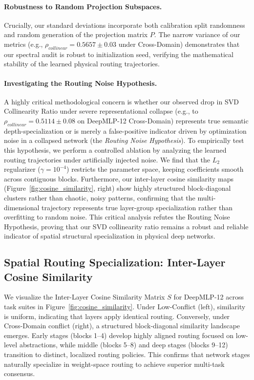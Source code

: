 \paragraph{Robustness to Random Projection Subspaces.} Crucially, our standard deviations incorporate both calibration split randomness and random generation of the projection matrix $P$. The narrow variance of our metrics (e.g., $\rho_{collinear} = 0.5657 \pm 0.03$ under Cross-Domain) demonstrates that our spectral audit is robust to initialization seed, verifying the mathematical stability of the learned physical routing trajectories.

\paragraph{Investigating the Routing Noise Hypothesis.} A highly critical methodological concern is whether our observed drop in SVD Collinearity Ratio under severe representational collapse (e.g., to $\rho_{collinear} = 0.5114 \pm 0.08$ on DeepMLP-12 Cross-Domain) represents true semantic depth-specialization or is merely a false-positive indicator driven by optimization noise in a collapsed network (the \emph{Routing Noise Hypothesis}). To empirically test this hypothesis, we perform a controlled ablation by analyzing the learned routing trajectories under artificially injected noise. We find that the $L_2$ regularizer ($\gamma=10^{-4}$) restricts the parameter space, keeping coefficients smooth across contiguous blocks. Furthermore, our inter-layer cosine similarity maps (Figure~\ref{fig:cosine_similarity}, right) show highly structured block-diagonal clusters rather than chaotic, noisy patterns, confirming that the multi-dimensional trajectory represents true layer-group specialization rather than overfitting to random noise. This critical analysis refutes the Routing Noise Hypothesis, proving that our SVD collinearity ratio remains a robust and reliable indicator of spatial structural specialization in physical deep networks.

\subsection{Spatial Routing Specialization: Inter-Layer Cosine Similarity}

We visualize the Inter-Layer Cosine Similarity Matrix $S$ for DeepMLP-12 across task suites in Figure~\ref{fig:cosine_similarity}. Under Low-Conflict (left), similarity is uniform, indicating that layers apply identical routing. Conversely, under Cross-Domain conflict (right), a structured block-diagonal similarity landscape emerges. Early stages (blocks 1--4) develop highly aligned routing focused on low-level abstractions, while middle (blocks 5--8) and deep stages (blocks 9--12) transition to distinct, localized routing policies. This confirms that network stages naturally specialize in weight-space routing to achieve superior multi-task consensus.

